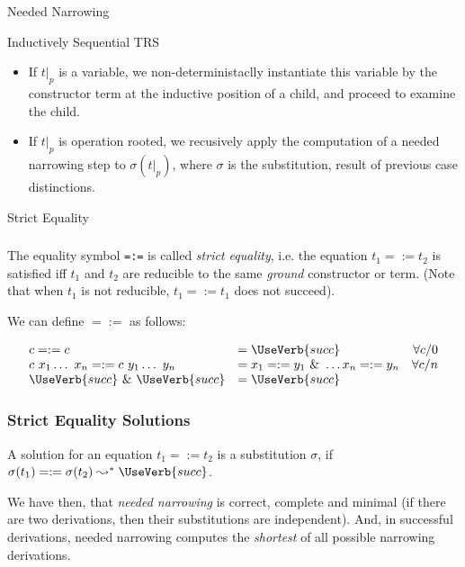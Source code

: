 \documentclass{beamer}
\begin{document}
\begin{section}{Needed Narrowing}
\begin{subsection}{Inductively Sequential TRS}
\begin{frame}
\begin{itemize}
\begin{itemize}
  \item If $t|_p$ is a variable, we non-deterministaclly instantiate this variable by the constructor term at the inductive position of a child, and proceed to examine the child.

  \item If $t|_p$ is operation rooted, we recusively apply the computation of a needed narrowing step to $\sigma(t|_p)$, where $\sigma$ is the substitution, result of previous case distinctions.
  \end{itemize}
\end{itemize}

\end{frame}
\end{subsection}
\begin{subsection}{Strict Equality}
\begin{frame}[fragile]
\frametitle{\subsecname}
    The equality symbol \verb|=:=| is called \textit{strict equality}, i.e. the equation $t_1 =:= t_2$ is satisfied iff $t_1$ and $t_2$ are reducible to the same \textit{ground} constructor or term. (Note that when $t_1$ is not reducible, $t_1 =:= t_1$ does not succeed).

    We can define $=:=$ as follows:

    \[
    \begin{array}{llr}
    
      c =:= c &= \UseVerb{succ} &\forall  c/0\\
      c ~ x_1 \ldots ~ x_n =:= c ~ y_1 \ldots ~ y_n &= x_1 =:= y_1 ~\&~ \ldots x_n =:= y_n &\forall c/n \\
      \UseVerb{succ}~ \&~ \UseVerb{succ} &= \UseVerb{succ}
    \end{array}
    \]
\end{frame}

\begin{frame}[fragile]
\frametitle{Strict Equality Solutions}
A solution for an equation $t_1 =:= t_2$ is a substitution $\sigma$, if $\sigma(t_1) =:= \sigma(t_2) \leadsto^* \UseVerb{succ}$.

We have then, that \textit{needed narrowing} is correct, complete and minimal (if there are two derivations, then their substitutions are independent). And, in successful derivations, needed narrowing computes the \textit{shortest} of all possible narrowing derivations.

\end{frame}
\end{subsection}


\end{section}
\end{document}
